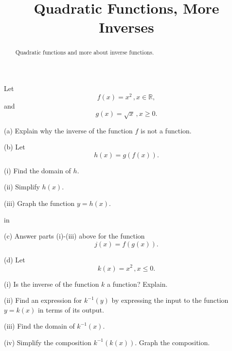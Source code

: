 \documentclass{ximera}
\title{Quadratic Functions, More Inverses}
\newcommand{\pskip}{\vskip 0.1 in}
\begin{document}
\begin{abstract}
Quadratic functions and more about inverse functions.
\end{abstract}
\maketitle

\begin{question}    \label{Q1:Quadratics}
Let 
\[
    f(x) = x^2 \, , x \in \mathbb{R} ,
\]
and 
\[
     g(x) = \sqrt{x} \, , x\geq 0 .
\]

(a) Explain why the inverse of the function $f$ is not a function.

(b) Let 
\[
    h(x) = g(f(x)) .
\]

(i) Find the domain of $h$.

(ii) Simplify $h(x)$.

(iii) Graph the function $y=h(x)$.

\pskip

(c) Answer parts (i)-(iii) above for the function
\[
   j(x) = f(g(x)) .
\]

(d) Let
\[
   k(x) = x^2 \, , x\leq 0 .
\]

(i) Is the inverse of the function $k$ a function? Explain.

(ii) Find an expression for $k^{-1}(y)$ by expressing the input to the function $y=k(x)$ in terms of its output.

(iii) Find the domain of $k^{-1}(x)$.

(iv) Simplify the composition $k^{-1}(k(x))$. Graph the composition.

\end{question}
\end{document}
